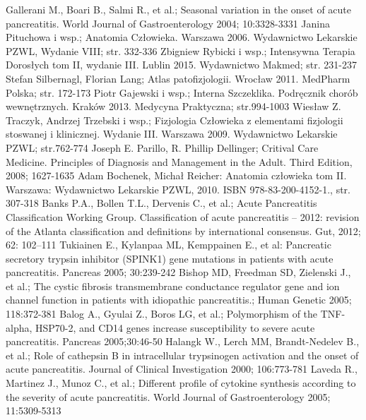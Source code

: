 \documentclass[a4paper, 12pt]{report}
\begin{document}
\begin{thebibliography}{99}
 Gallerani M., Boari B., Salmi R., et al.; Seasonal
  variation in the onset of acute pancreatitis. World Journal of
  Gastroenterology 2004; 10:3328-3331
 Janina Pituchowa i wsp.; Anatomia
  Człowieka. Warszawa 2006. Wydawnictwo Lekarskie PZWL, Wydanie VIII;
  str. 332-336
 Zbigniew Rybicki i wsp.; Intensywna Terapia Dorosłych
  tom II, wydanie III. Lublin 2015. Wydawnictwo Makmed; str. 231-237
 Stefan Silbernagl, Florian Lang; Atlas
  patofizjologii. Wrocław 2011. MedPharm Polska; str. 172-173
 Piotr Gajewski i wsp.; Interna
  Szczeklika. Podręcznik chorób wewnętrznych. Kraków 2013. Medycyna
  Praktyczna; str.994-1003
 Wiesław Z. Traczyk, Andrzej Trzebski i wsp.;
  Fizjologia Człowieka z elementami fizjologii stoswanej i
  klinicznej. Wydanie III. Warszawa 2009. Wydawnictwo Lekarskie PZWL;
  str.762-774
 Joseph E. Parillo, R. Phillip Dellinger; Critival
  Care Medicine. Principles of Diagnosis and Management in the
  Adult. Third Edition, 2008; 1627-1635
 Adam Bochenek, Michał Reicher: Anatomia człowieka
  tom II. Warszawa: Wydawnictwo Lekarskie PZWL, 2010. ISBN
  978-83-200-4152-1., str. 307-318
 Banks P.A., Bollen T.L., Dervenis C., et al.; Acute
  Pancreatitis Classification Working Group. Classification of acute
  pancreatitis – 2012: revision of the Atlanta classification and
  definitions by international consensus. Gut, 2012; 62: 102–111
 Tukiainen E., Kylanpaa ML, Kemppainen E., et al:
  Pancreatic secretory trypsin inhibitor (SPINK1) gene mutations in
  patients with acute pancreatitis. Pancreas 2005; 30:239-242
 Bishop MD, Freedman SD, Zielenski J., et al.; The cystic
  fibrosis transmembrane conductance regulator gene and ion channel
  function in patients with idiopathic pancreatitis.; Human Genetic
  2005; 118:372-381
 Balog A., Gyulai Z., Boros LG, et al.; Polymorphism of
  the TNF-alpha, HSP70-2, and CD14 genes increase susceptibility to
  severe acute pancreatitis. Pancreas 2005;30:46-50
 Halangk W., Lerch MM, Brandt-Nedelev B., et al.; Role of
  cathepsin B in intracellular trypsinogen activation and the onset of
  acute pancreatitis. Journal of Clinical Investigation 2000; 106:773-781
 Laveda R., Martinez J., Munoz C., et al.; Different
  profile of cytokine synthesis according to the severity of acute
  pancreatitis. World Journal of Gastroenterology 2005; 11:5309-5313

\end{thebibliography}
\end{document}

